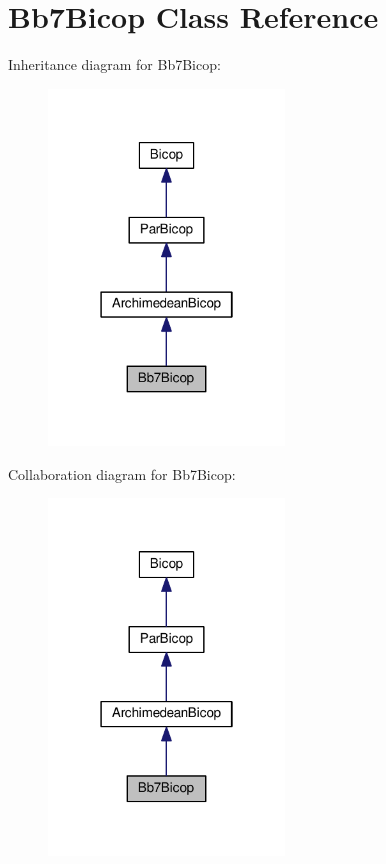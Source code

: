 \hypertarget{class_bb7_bicop}{}\section{Bb7\+Bicop Class Reference}
\label{class_bb7_bicop}


Inheritance diagram for Bb7\+Bicop\+:\nopagebreak
\begin{figure}[H]
\begin{center}
\leavevmode
\includegraphics[width=178pt]{class_bb7_bicop__inherit__graph}
\end{center}
\end{figure}


Collaboration diagram for Bb7\+Bicop\+:\nopagebreak
\begin{figure}[H]
\begin{center}
\leavevmode
\includegraphics[width=178pt]{class_bb7_bicop__coll__graph}
\end{center}
\end{figure}
